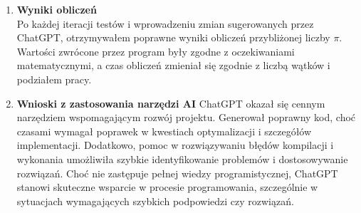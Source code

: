\begin{enumerate}
  \item \textbf{Wyniki obliczeń} \\
        Po każdej iteracji testów i wprowadzeniu zmian sugerowanych przez ChatGPT, otrzymywałem poprawne wyniki obliczeń przybliżonej liczby \(\pi\). Wartości zwrócone przez program były zgodne z oczekiwaniami matematycznymi, a czas obliczeń zmieniał się zgodnie z liczbą wątków i podziałem pracy.

  \item \textbf{Wnioski z zastosowania narzędzi AI}
        ChatGPT okazał się cennym narzędziem wspomagającym rozwój projektu. Generował poprawny kod, choć czasami wymagał poprawek w kwestiach optymalizacji i szczegółów implementacji. Dodatkowo, pomoc w rozwiązywaniu błędów kompilacji i wykonania umożliwiła szybkie identyfikowanie problemów i dostosowywanie rozwiązań. Choć nie zastępuje pełnej wiedzy programistycznej, ChatGPT stanowi skuteczne wsparcie w procesie programowania, szczególnie w sytuacjach wymagających szybkich podpowiedzi czy rozwiązań.

\end{enumerate}
